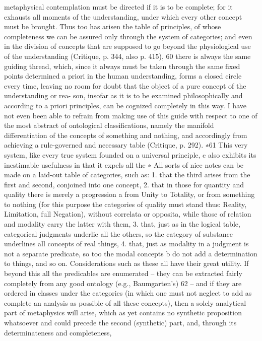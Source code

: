metaphysical contemplation must be directed if it is to be complete; for
it exhausts all moments of the understanding, under which every other
concept must be brought. Thus too has arisen the table of principles,
of whose completeness we can be assured only through the system of
categories; and even in the division of concepts that are supposed to go
beyond the physiological use of the understanding (Critique, p. 344, also
p. 415), 60 there is always the same guiding thread, which, since it always
must be taken through the same ﬁxed points determined a priori in the
human understanding, forms a closed circle every time, leaving no room
for doubt that the object of a pure concept of the understanding or rea-
son, insofar as it is to be examined philosophically and according to a
priori principles, can be cognized completely in this way. I have not even
been able to refrain from making use of this guide with respect to one
of the most abstract of ontological classiﬁcations, namely the manifold
differentiation of the concepts of something and nothing, and accordingly
from achieving a rule-governed and necessary table (Critique, p. 292). ∗61
This very system, like every true system founded on a universal
principle, c also exhibits its inestimable usefulness in that it expels all the
∗ All sorts of nice notes can be made on a laid-out table of categories, such as:
1. that the third arises from the ﬁrst and second, conjoined into one concept,
2. that in those for quantity and quality there is merely a progression a from
Unity to Totality, or from something to nothing (for this purpose the categories
of quality must stand thus: Reality, Limitation, full Negation), without correlata
or opposita, while those of relation and modality carry the latter with them,
3. that, just as in the logical table, categorical judgments underlie all the others,
so the category of substance underlines all concepts of real things, 4. that,
just as modality in a judgment is not a separate predicate, so too the modal
concepts b do not add a determination to things, and so on. Considerations
such as these all have their great utility. If beyond this all the predicables are
enumerated – they can be extracted fairly completely from any good ontology
(e.g., Baumgarten’s) 62 – and if they are ordered in classes under the categories
(in which one must not neglect to add as complete an analysis as possible of all
these concepts), then a solely analytical part of metaphysics will arise, which
as yet contains no synthetic proposition whatsoever and could precede the
second (synthetic) part, and, through its determinateness and completeness,
